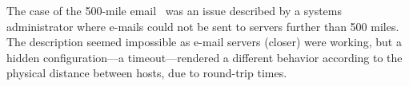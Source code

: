 The case of the 500-mile email~\cite{500mileemail} was an issue described by a systems administrator where e-mails could not be sent to servers further than 500 miles.
The description seemed impossible as e-mail servers (closer) were working, but a hidden configuration---a timeout---rendered a different behavior according to the physical distance between hosts, due to round-trip times.
